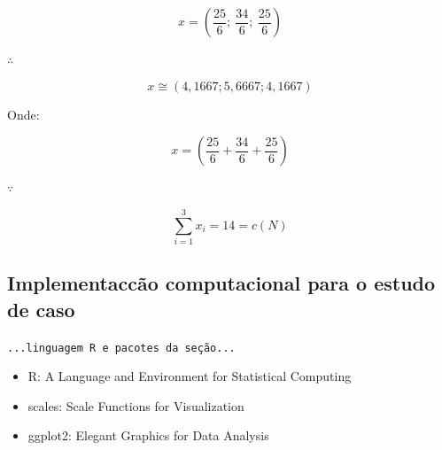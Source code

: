 \documentclass[
	article,			        %
	11pt,				          %
	oneside,			        %
	a4paper,			        %
	english,			        %
	brazil,				        %
	sumario=tradicional
]{abntex2}\usepackage[]{graphicx}\usepackage[]{color}
\begin{document}
\begin{equation}
 \label{eq:shaValXSol}
  x = \left ( 
        \frac{25}{6}; \
        \frac{34}{6}; \
        \frac{25}{6}
      \right ) 
\end{equation}

$\therefore$

\begin{equation}
 \label{eq:shaValXSolApx}
  x \cong \left (4,1667; 5,6667; 4,1667 \right ) 
\end{equation}

Onde:

\begin{equation}
 \label{eq:shaValXProva}
  x = \left ( 
        \frac{25}{6} +
        \frac{34}{6} +
        \frac{25}{6}
      \right )
\end{equation}

$\because$

\begin{equation}
 \label{eq:shaValXPorque}
 \sum_{i = 1}^{3}x_i = 14 = c(N)
\end{equation}

\subsection{Implementac{c}ão computacional para o estudo de caso}

  \texttt{\color{red}...linguagem R e pacotes da seção...}
  \begin{itemize}
    \item R: A Language and Environment for Statistical Computing \cite{R.2016}
    \item scales: Scale Functions for Visualization \cite{Wickham.2015}
    \item ggplot2: Elegant Graphics for Data Analysis \cite{Wickham.2009}
  \end{itemize}
\end{document}
